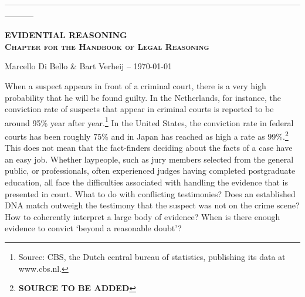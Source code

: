 \documentclass[10pt]{article}
\begin{document}
\thispagestyle{empty}

\vspace{-2cm}
\noindent
-----------------------------------------------------------------------------------------------------------------------


\vspace{5mm}
\noindent
\textsc{\large \bf  EVIDENTIAL REASONING \\ Chapter for the Handbook of Legal Reasoning}

\vspace{3mm}
\noindent
Marcello Di Bello \& Bart Verheij --  \today \\
\vspace{1cm}

\vspace{1cm}



\vspace{1cm}



\tableofcontents

\newpage

\noindent When a suspect appears in front of a criminal court, there is a very high probability that he will be found guilty. In the Netherlands, for instance, the conviction rate of suspects that appear in criminal courts is reported to be around 95\% year after year.\footnote{Source: CBS, the Dutch central bureau of statistics, publishing its data at www.cbs.nl.} 
In the United States, the conviction rate in federal courts has been roughly 75\% and in Japan has reached as high a rate as 99\%.\footnote{\textbf{SOURCE TO BE ADDED}} This does not mean that the fact-finders deciding about the facts of a  case have an easy job. Whether laypeople, such as jury members selected from the general public, or professionals, often experienced judges having completed postgraduate education, all face the difficulties associated with handling the evidence that is presented in court. What to do with conflicting testimonies? Does an established DNA match outweigh the testimony that the suspect was not on the crime scene? How to coherently interpret a large body of evidence? 
When is there enough evidence to convict `beyond a reasonable doubt'? 
\end{document}
